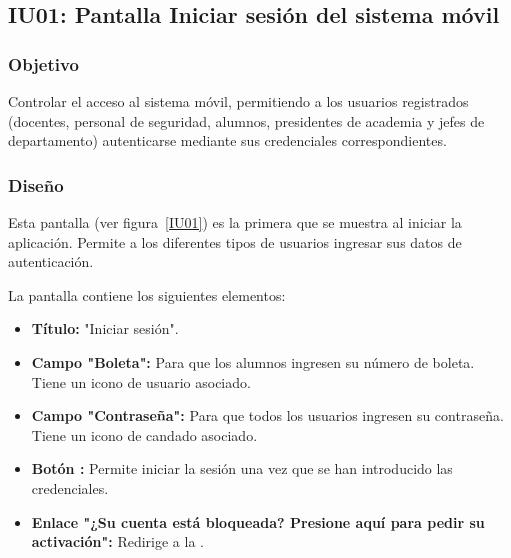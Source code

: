 
\subsection{IU01: Pantalla Iniciar sesión del sistema móvil}


\newpage

\subsubsection{Objetivo}
Controlar el acceso al sistema móvil, permitiendo a los usuarios registrados (docentes, personal de seguridad, alumnos, presidentes de academia y jefes de departamento) autenticarse mediante sus credenciales correspondientes.

\subsubsection{Diseño}
Esta pantalla  (ver figura~\ref{IU01}) es la primera que se muestra al iniciar la aplicación. Permite a los diferentes tipos de usuarios ingresar sus datos de autenticación.



La pantalla contiene los siguientes elementos:
\begin{itemize}
	\item \textbf{Título:} "Iniciar sesión".
	\item \textbf{Campo "Boleta":} Para que los alumnos ingresen su número de boleta. Tiene un icono de usuario asociado.
	\item \textbf{Campo "Contraseña":} Para que todos los usuarios ingresen su contraseña. Tiene un icono de candado asociado.
	\item \textbf{Botón :} Permite iniciar la sesión una vez que se han introducido las credenciales.
	\item \textbf{Enlace "¿Su cuenta está bloqueada? Presione aquí para pedir su activación":} Redirige a la .
\end{itemize}

